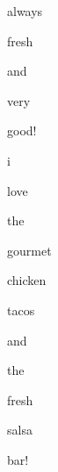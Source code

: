 \documentclass[varwidth]{standalone}
\begin{document}
 \begin{CJK*}{UTF8}{gbsn} 
{\setlength{\fboxsep}{0pt}\colorbox{white!0}{\parbox{0.9\textwidth}{
\colorbox{red!11.171310424804688}{\strut always} 
\colorbox{red!7.710459232330322}{\strut fresh} 
\colorbox{red!16.017269134521484}{\strut and} 
\colorbox{red!46.89748764038086}{\strut very} 
\colorbox{red!100.0}{\strut good!} 
\colorbox{red!73.6317138671875}{\strut i} 
\colorbox{red!27.706462860107422}{\strut love} 
\colorbox{red!66.13557434082031}{\strut the} 
\colorbox{red!68.98259735107422}{\strut gourmet} 
\colorbox{red!47.73833465576172}{\strut chicken} 
\colorbox{red!14.259757041931152}{\strut tacos} 
\colorbox{red!16.575817108154297}{\strut and} 
\colorbox{red!0.0}{\strut the} 
\colorbox{red!17.773727416992188}{\strut fresh} 
\colorbox{red!16.587430953979492}{\strut salsa} 
\colorbox{red!11.93222713470459}{\strut bar!} 

}}}\end{CJK*}
\end{document}
